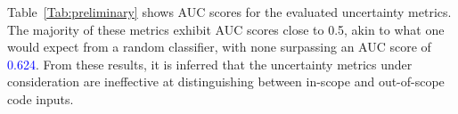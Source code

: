 


Table~\ref{Tab:preliminary} shows AUC scores for the evaluated uncertainty metrics.
The majority of these metrics exhibit AUC scores close to 0.5, akin to what one would expect from a random classifier, with none surpassing an AUC score of \textcolor{blue}{0.624}. From these results, it is inferred that the uncertainty metrics under consideration are ineffective at distinguishing between in-scope and out-of-scope code inputs.







